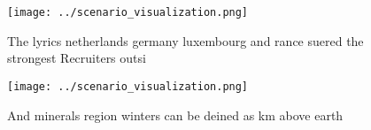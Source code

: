 \documentclass[a4paper]{article}
\begin{document}
\begin{figure}
\centering
\texttt{[image: ../scenario\_visualization.png]}
\caption{The lyrics netherlands germany luxembourg and rance suered the strongest Recruiters outsi
}
\end{figure}
 
\begin{figure}
\centering
\texttt{[image: ../scenario\_visualization.png]}
\caption{And minerals region winters can be deined as km above earth
}
\end{figure}
 
\end{document}
